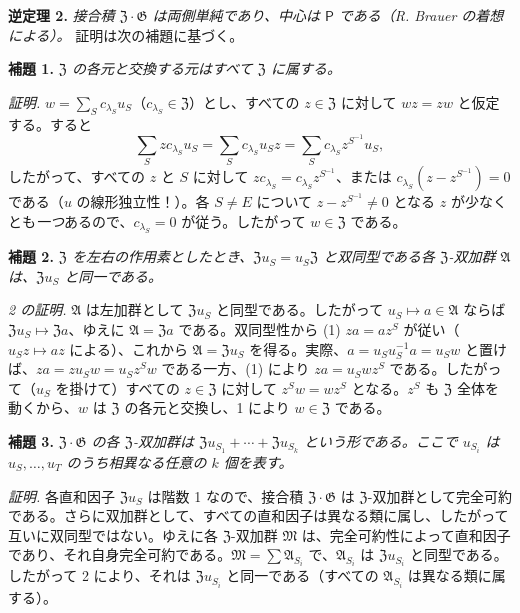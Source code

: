 \noindent\textbf{逆定理 2.} \emph{接合積 \(\mathfrak Z\cdot\mathfrak G\) は両側単純であり、中心は \(\mathsf P\) である（R. Brauer の着想による）。} 証明は次の補題に基づく。

\noindent\textbf{補題 1.} \emph{\(\mathfrak Z\) の各元と交換する元はすべて \(\mathfrak Z\) に属する。}

\noindent\emph{証明.} \(w=\sum_S c_{\lambda_S}u_S\)（\(c_{\lambda_S}\in\mathfrak Z\)）とし、すべての \(z\in\mathfrak Z\) に対して \(wz=zw\) と仮定する。すると
\[
\sum_S zc_{\lambda_S}u_S
=\sum_S c_{\lambda_S}u_Sz
=\sum_S c_{\lambda_S}z^{S^{-1}}u_S,
\]
したがって、すべての \(z\) と \(S\) に対して \(zc_{\lambda_S}=c_{\lambda_S}z^{S^{-1}}\)、または \(c_{\lambda_S}(z-z^{S^{-1}})=0\) である（\(u\) の線形独立性！）。各 \(S\ne E\) について \(z-z^{S^{-1}}\ne0\) となる \(z\) が少なくとも\emph{一つ}あるので、\(c_{\lambda_S}=0\) が従う。したがって \(w\in\mathfrak Z\) である。

\noindent\textbf{補題 2.} \emph{\(\mathfrak Z\) を左右の作用素としたとき、\(\mathfrak Zu_S=u_S\mathfrak Z\) と双同型である各 \(\mathfrak Z\)-双加群 \(\mathfrak A\) は、\(\mathfrak Zu_S\) と同一である。}

\noindent\emph{2 の証明.} \(\mathfrak A\) は左加群として \(\mathfrak Zu_S\) と同型である。したがって \(u_S\mapsto a\in\mathfrak A\) ならば \(\mathfrak Zu_S\mapsto\mathfrak Za\)、ゆえに \(\mathfrak A=\mathfrak Za\) である。双同型性から (1) \(za=az^S\) が従い（\(u_Sz\mapsto az\) による）、これから \(\mathfrak A=\mathfrak Zu_S\) を得る。実際、\(a=u_Su_S^{-1}a=u_Sw\) と置けば、\(za=zu_Sw=u_Sz^Sw\) である一方、(1) により \(za=u_Swz^S\) である。したがって（\(u_S\) を掛けて）すべての \(z\in\mathfrak Z\) に対して \(z^Sw=wz^S\) となる。\(z^S\) も \(\mathfrak Z\) 全体を動くから、\(w\) は \(\mathfrak Z\) の各元と交換し、1 により \(w\in\mathfrak Z\) である。

\noindent\textbf{補題 3.} \emph{\(\mathfrak Z\cdot\mathfrak G\) の各 \(\mathfrak Z\)-双加群は \(\mathfrak Zu_{S_1}+\cdots+\mathfrak Zu_{S_k}\) という形である。ここで \(u_{S_i}\) は \(u_S,\ldots,u_T\) のうち相異なる任意の \(k\) 個を表す。}

\noindent\emph{証明.} 各直和因子 \(\mathfrak Zu_S\) は階数 1 なので、接合積 \(\mathfrak Z\cdot\mathfrak G\) は \(\mathfrak Z\)-双加群として完全可約である。さらに双加群として、すべての直和因子は異なる類に属し、したがって互いに双同型ではない。ゆえに各 \(\mathfrak Z\)-双加群 \(\mathfrak M\) は、完全可約性によって直和因子であり、それ自身完全可約である。\(\mathfrak M=\sum\mathfrak A_{S_i}\) で、\(\mathfrak A_{S_i}\) は \(\mathfrak Zu_{S_i}\) と同型である。したがって 2 により、それは \(\mathfrak Zu_{S_i}\) と同一である（すべての \(\mathfrak A_{S_i}\) は異なる類に属する）。

